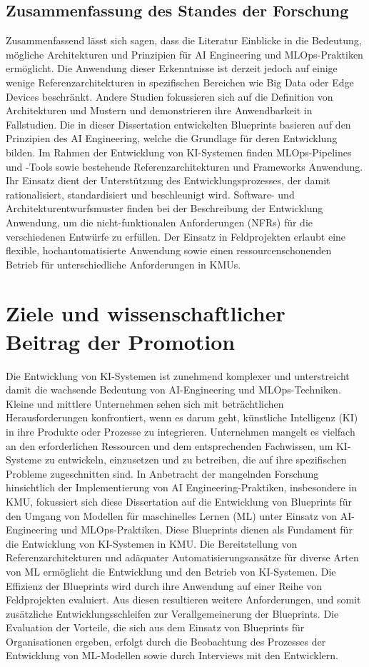 \documentclass[11pt,a4paper,pointlessnumbers]{scrartcl}
\theoremstyle{break}
\numberwithin{equation}{section}
\begin{document}
\subsection{Zusammenfassung des Standes der Forschung}
Zusammenfassend lässt sich sagen, dass die Literatur Einblicke in die Bedeutung, mögliche Architekturen und Prinzipien für AI Engineering und MLOps-Praktiken ermöglicht. Die Anwendung dieser Erkenntnisse ist derzeit jedoch auf einige wenige Referenzarchitekturen in spezifischen Bereichen wie Big Data oder Edge Devices beschränkt. Andere Studien fokussieren sich auf die Definition von Architekturen und Mustern und demonstrieren ihre Anwendbarkeit in Fallstudien. Die in dieser Dissertation entwickelten Blueprints basieren auf den Prinzipien des AI Engineering, welche die Grundlage für deren Entwicklung bilden. Im Rahmen der Entwicklung von KI-Systemen finden MLOps-Pipelines und -Tools sowie bestehende Referenzarchitekturen und Frameworks Anwendung. Ihr Einsatz dient der Unterstützung des Entwicklungsprozesses, der damit rationalisiert, standardisiert und beschleunigt wird. 
Software- und Architekturentwurfsmuster finden bei der Beschreibung der Entwicklung Anwendung, um die nicht-funktionalen Anforderungen (NFRs) für die verschiedenen Entwürfe zu erfüllen. Der Einsatz in Feldprojekten erlaubt eine flexible, hochautomatisierte Anwendung sowie einen ressourcenschonenden Betrieb für unterschiedliche Anforderungen in KMUs.

\section{Ziele und wissenschaftlicher Beitrag der Promotion}
Die Entwicklung von KI-Systemen ist zunehmend komplexer und unterstreicht damit die wachsende Bedeutung von AI-Engineering und MLOps-Techniken. Kleine und mittlere Unternehmen sehen sich mit beträchtlichen Herausforderungen konfrontiert, wenn es darum geht, künstliche Intelligenz (KI) in ihre Produkte oder Prozesse zu integrieren. Unternehmen mangelt es vielfach an den erforderlichen Ressourcen und dem entsprechenden Fachwissen, um KI-Systeme zu entwickeln, einzusetzen und zu betreiben, die auf ihre spezifischen Probleme zugeschnitten sind. In Anbetracht der mangelnden Forschung hinsichtlich der Implementierung von AI Engineering-Praktiken, insbesondere in KMU, fokussiert sich diese Dissertation auf die Entwicklung von Blueprints für den Umgang von Modellen für maschinelles Lernen (ML) unter Einsatz von AI-Engineering und MLOps-Praktiken. 
Diese Blueprints dienen als Fundament für die Entwicklung von KI-Systemen in KMU. Die Bereitstellung von Referenzarchitekturen und adäquater Automatisierungsansätze für diverse Arten von ML ermöglicht die Entwicklung und den Betrieb von KI-Systemen. Die Effizienz der Blueprints wird durch ihre Anwendung auf einer Reihe von Feldprojekten evaluiert. Aus diesen resultieren weitere Anforderungen, und somit zusätzliche Entwicklungsschleifen zur Verallgemeinerung der Blueprints. 
Die Evaluation der Vorteile, die sich aus dem Einsatz von Blueprints für Organisationen ergeben, erfolgt durch die Beobachtung des Prozesses der Entwicklung von ML-Modellen sowie durch Interviews mit den Entwicklern.
\end{document}
